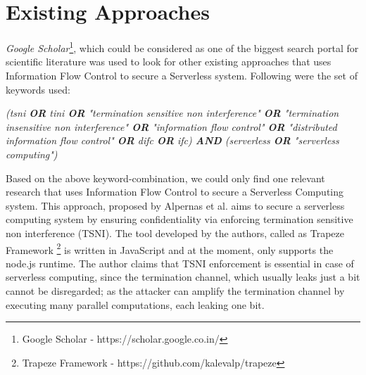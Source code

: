\section{Existing Approaches}
\label{section:ExistingApproaches}
\textit{Google Scholar}\footnote{Google Scholar - https://scholar.google.co.in/}, which could be considered as one of the biggest search portal for scientific literature was used to look for other existing approaches that uses Information Flow Control to secure a Serverless system. Following were the set of keywords used:
\begin{center}
	\begin{mdframed}[frametitle=Keywords Used, linewidth = 0.05cm, backgroundcolor=blue!20, nobreak=true]
		\textit{(tsni \textbf{OR} tini \textbf{OR} "termination sensitive non interference" \textbf{OR} "termination insensitive non interference" \textbf{OR} "information flow control" \textbf{OR} "distributed information flow control" \textbf{OR} difc \textbf{OR} ifc) \textbf{AND} (serverless \textbf{OR} "serverless computing")}
	\end{mdframed}
\end{center}
Based on the above keyword-combination, we could only find one relevant research that uses Information Flow Control to secure a Serverless Computing system. This approach, proposed by Alpernas et al. \cite{Alpernas2018} aims to secure a serverless computing system by ensuring confidentiality via enforcing termination sensitive non interference (TSNI). The tool developed by the authors, called as Trapeze Framework \footnote{Trapeze Framework - https://github.com/kalevalp/trapeze} is written in JavaScript and at the moment, only supports the node.js runtime. The author claims that TSNI enforcement is essential in case of serverless computing, since the termination channel, which usually leaks just a bit cannot be disregarded; as the attacker can amplify the termination channel by executing many parallel computations, each leaking one bit.